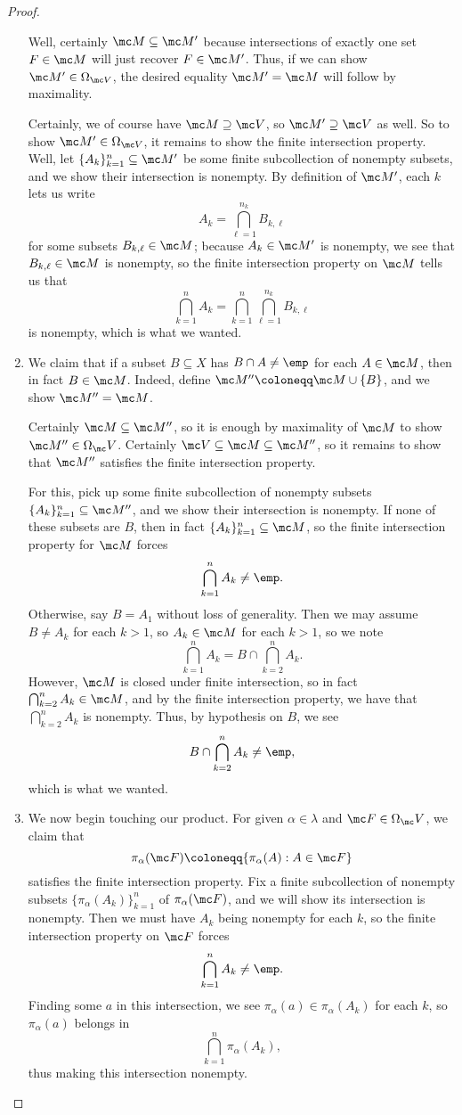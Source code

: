 \documentclass[../notes.tex]{subfiles}
\begin{document}
\begin{proof}
\begin{enumerate}
		Well, certainly $\mc M\subseteq\mc M'$ because intersections of exactly one set $F\in\mc M$ will just recover $F\in\mc M'$. Thus, if we can show $\mc M'\in\Omega_{\mc V}$, the desired equality $\mc M'=\mc M$ will follow by maximality.
		
		Certainly, we of course have $\mc M\supseteq\mc V$, so $\mc M'\supseteq\mc V$ as well. So to show $\mc M'\in\Omega_{\mc V}$, it remains to show the finite intersection property. Well, let $\{A_k\}_{k=1}^n\subseteq\mc M'$ be some finite subcollection of nonempty subsets, and we show their intersection is nonempty. By definition of $\mc M'$, each $k$ lets us write
		\[A_k=\bigcap_{\ell=1}^{n_k}B_{k,\ell}\]
		for some subsets $B_{k,\ell}\in\mc M$; because $A_k\in\mc M'$ is nonempty, we see that $B_{k,\ell}\in\mc M$ is nonempty, so the finite intersection property on $\mc M$ tells us that
		\[\bigcap_{k=1}^nA_k=\bigcap_{k=1}^n\bigcap_{\ell=1}^{n_k}B_{k,\ell}\]
		is nonempty, which is what we wanted.

		\item \label{item:mprop2} We claim that if a subset $B\subseteq X$ has $B\cap A\ne\emp$ for each $A\in\mc M$, then in fact $B\in\mc M$. Indeed, define $\mc M''\coloneqq\mc M\cup\{B\}$, and we show $\mc M''=\mc M$.

		Certainly $\mc M\subseteq\mc M''$, so it is enough by maximality of $\mc M$ to show $\mc M''\in\Omega_\mc V$. Certainly $\mc V\subseteq\mc M\subseteq\mc M''$, so it remains to show that $\mc M''$ satisfies the finite intersection property.

		For this, pick up some finite subcollection of nonempty subsets $\{A_k\}_{k=1}^n\subseteq\mc M''$, and we show their intersection is nonempty. If none of these subsets are $B$, then in fact $\{A_k\}_{k=1}^n\subseteq\mc M$, so the finite intersection property for $\mc M$ forces
		\[\bigcap_{k=1}^nA_k\ne\emp.\]
		Otherwise, say $B=A_1$ without loss of generality. Then we may assume $B\ne A_k$ for each $k>1$, so $A_k\in\mc M$ for each $k>1$, so we note
		\[\bigcap_{k=1}^nA_k=B\cap\bigcap_{k=2}^nA_k.\]
		However, $\mc M$ is closed under finite intersection, so in fact $\bigcap_{k=2}^nA_k\in\mc M$, and by the finite intersection property, we have that $\bigcap_{k=2}^nA_k$ is nonempty. Thus, by hypothesis on $B$, we see
		\[B\cap\bigcap_{k=2}^nA_k\ne\emp,\]
		which is what we wanted.

		\item We now begin touching our product. For given $\alpha\in\lambda$ and $\mc F\in\Omega_\mc V$, we claim that
		\[\pi_\alpha(\mc F)\coloneqq\{\pi_\alpha(A):A\in\mc F\}\]
		satisfies the finite intersection property. Fix a finite subcollection of nonempty subsets $\{\pi_\alpha(A_k)\}_{k=1}^n$ of $\pi_\alpha(\mc F)$, and we will show its intersection is nonempty. Then we must have $A_k$ being nonempty for each $k$, so the finite intersection property on $\mc F$ forces
		\[\bigcap_{k=1}^nA_k\ne\emp.\]
		Finding some $a$ in this intersection, we see $\pi_\alpha(a)\in\pi_\alpha(A_k)$ for each $k$, so $\pi_\alpha(a)$ belongs in
		\[\bigcap_{k=1}^n\pi_\alpha(A_k),\]
		thus making this intersection nonempty.


\end{enumerate}
\end{proof}
\end{document}
